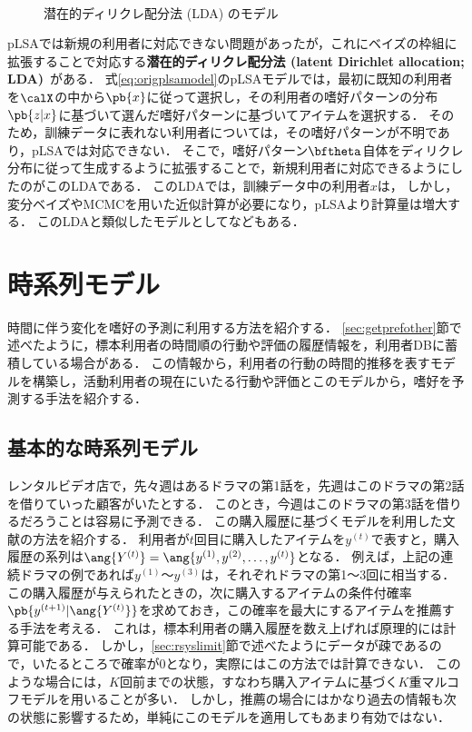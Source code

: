 \begin{figure}
\centering
{}\\
\caption{潜在的ディリクレ配分法 (LDA) のモデル\cite{jmlr:03:05}}
\label{fig:lda}
\end{figure}

pLSAでは新規の利用者に対応できない問題があったが，これにベイズの枠組に拡張することで対応する\textbf{潜在的ディリクレ配分法 (latent Dirichlet allocation; LDA)}~\cite{jmlr:03:05}がある．
式\eqref{eq:origplsamodel}のpLSAモデルでは，最初に既知の利用者を$\calX$の中から$\pb{x}$に従って選択し，その利用者の嗜好パターンの分布$\pb{z|x}$に基づいて選んだ嗜好パターンに基づいてアイテムを選択する．
そのため，訓練データに表れない利用者については，その嗜好パターンが不明であり，pLSAでは対応できない．
そこで，嗜好パターン$\bftheta$自体をディリクレ分布に従って生成するように拡張することで，新規利用者に対応できるようにしたのがこのLDAである．
このLDAでは，訓練データ中の利用者$x$は，
しかし，変分ベイズやMCMCを用いた近似計算が必要になり，pLSAより計算量は増大する．
このLDAと類似したモデルとして\cite{icml:04:07}などもある．


\section{時系列モデル}
\label{sec:timeseries}

時間に伴う変化を嗜好の予測に利用する方法を紹介する．
\ref{sec:getprefother}節で述べたように，標本利用者の時間順の行動や評価の履歴情報を，利用者DBに蓄積している場合がある．
この情報から，利用者の行動の時間的推移を表すモデルを構築し，活動利用者の現在にいたる行動や評価とこのモデルから，嗜好を予測する手法を紹介する．

\subsection{基本的な時系列モデル}

レンタルビデオ店で，先々週はあるドラマの第1話を，先週はこのドラマの第2話を借りていった顧客がいたとする．
このとき，今週はこのドラマの第3話を借りるだろうことは容易に予測できる．
この購入履歴に基づくモデルを利用した文献\cite{nips:03:03}の方法を紹介する．
利用者が$t$回目に購入したアイテムを$y^{(t)}$で表すと，購入履歴の系列は$\ang{Y^{(t)}}=\ang{y^{(1)},y^{(2)},\ldots,y^{(t)}}$となる．
例えば，上記の連続ドラマの例であれば$y^{(1)}$〜$y^{(3)}$は，それぞれドラマの第1〜3回に相当する．
この購入履歴が与えられたときの，次に購入するアイテムの条件付確率$\pb{y^{(t+1)}|\ang{Y^{(t)}}}$を求めておき，この確率を最大にするアイテムを推薦する手法を考える．
これは，標本利用者の購入履歴を数え上げれば原理的には計算可能である．
しかし，\ref{sec:rsyslimit}節で述べたようにデータが疎であるので，いたるところで確率が$0$となり，実際にはこの方法では計算できない．
このような場合には，$K$回前までの状態，すなわち購入アイテムに基づく$K$重マルコフモデルを用いることが多い．
しかし，推薦の場合にはかなり過去の情報も次の状態に影響するため，単純にこのモデルを適用してもあまり有効ではない．

